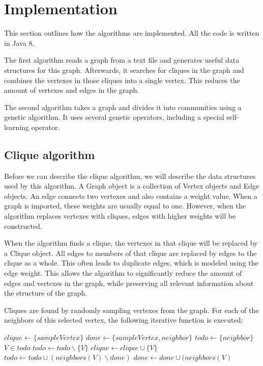 \section{Implementation}
\label{sec:implementation}
This section outlines how the algorithms are implemented. All the code is written in Java 8.
\par
 The first algorithm reads a graph from a text file and generates useful data structures for this graph. Afterwards, it searches for cliques in the graph and combines the vertexes in those cliques into a single vertex. This reduces the amount of vertexes and edges in the graph.
\par
The second algorithm takes a graph and divides it into communities using a genetic algorithm. It uses several genetic operators, including a special self-learning operator.
\subsection{Clique algorithm}
Before we can describe the clique algorithm, we will describe the data structures used by this algorithm. A Graph object is a collection of Vertex objects and Edge objects. An edge connects two vertexes and also contains a weight value. When a graph is imported, these weights are usually equal to one. However, when the algorithm replaces vertexes with cliques, edges with higher weights will be constructed. 
\par
When the algorithm finds a clique, the vertexes in that clique will be replaced by a Clique object. All edges to members of that clique are replaced by edges to the clique as a whole. This often leads to duplicate edges, which is modeled using the edge weight. This allows the algorithm to significantly reduce the amount of edges and vertexes in the graph, while preserving all relevant information about the structure of the graph.
\par
Cliques are found by randomly sampling vertexes from the graph. For each of the neighbors of this selected vertex, the following iterative function is executed:
\\
\begin{algorithmic}
\STATE $clique \leftarrow \{sampleVertex\}$
\STATE $done \leftarrow \{sampleVertex, neighbor\}$
\STATE $todo \leftarrow \{neighbor\}$
\STATE $V \in todo$
\STATE $todo \leftarrow todo \backslash \{V\}$
\STATE $clique \leftarrow clique \cup \{V\}$
\STATE $todo \leftarrow todo \cup (neighbors(V) \backslash done )$
\STATE $done \leftarrow done \cup(neighbors(V)$
\ENDIF
\ENDWHILE
{}
\ELSE
\RETURN{$\{\}$}
\ENDIF
\end{algorithmic}

